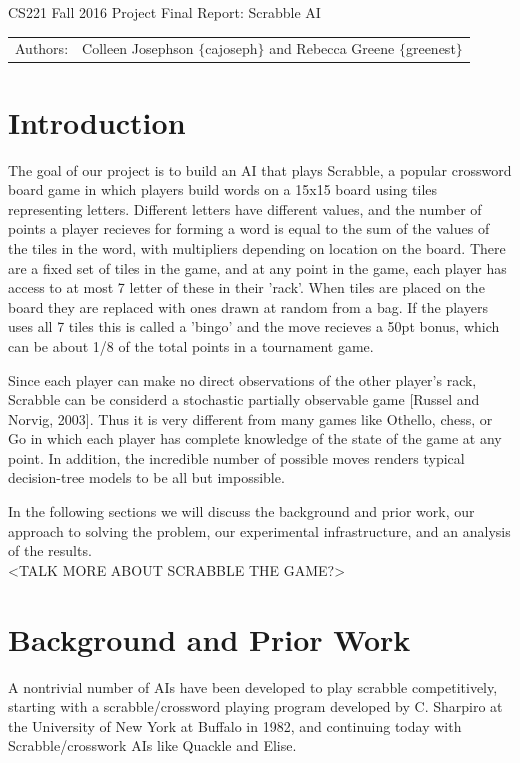 \documentclass[12pt]{article}
\begin{document}
\begin{center}
{\Large CS221 Fall 2016 Project Final Report: Scrabble AI}

\begin{tabular}{rl}
  Authors: & Colleen Josephson $\{$cajoseph$\}$ and Rebecca Greene $\{$greenest$\}$\\
\end{tabular}
\end{center}


\section*{Introduction}
The goal of our project is to build an AI that plays Scrabble, a
popular crossword board game in which players build words on a 15x15
board using tiles representing letters. Different letters have
different values, and the number of points a player recieves for
forming a word is equal to the sum of the values of the tiles in the
word, with multipliers depending on location on the board. There are a
fixed set of tiles in the game, and at any point in the game, each
player has access to at most 7 letter of these in their 'rack'.  When
tiles are placed on the board they are replaced with ones drawn at
random from a bag. If the players uses all 7 tiles this is called a
'bingo' and the move recieves a 50pt bonus, which can be about 1/8 of
the total points in a tournament game.

Since each player can make no direct observations of the other
player's rack, Scrabble can be considerd a stochastic partially
observable game [Russel and Norvig, 2003]. Thus it is very different
from many games like Othello, chess, or Go in which each player has
complete knowledge of the state of the game at any point. In addition,
the incredible number of possible moves renders typical decision-tree
models to be all but impossible.

In the following sections we will discuss the background and prior
work, our approach to solving the problem, our experimental
infrastructure, and an analysis of the results.\\

<TALK MORE ABOUT SCRABBLE THE GAME?> \\
\section*{Background and Prior Work}

A nontrivial number of AIs have been developed to play scrabble competitively, starting with a scrabble/crossword playing program developed by C. Sharpiro at the University of New York at Buffalo in 1982, and continuing today with Scrabble/crosswork AIs like Quackle and Elise. 
\end{document}
